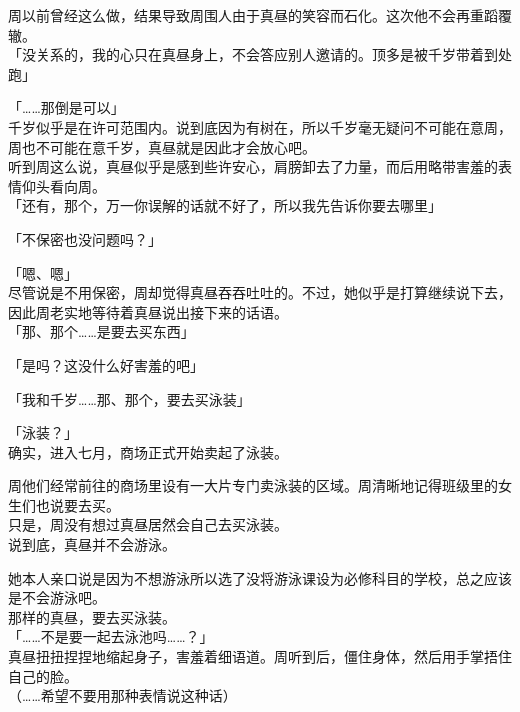 周以前曾经这么做，结果导致周围人由于真昼的笑容而石化。这次他不会再重蹈覆辙。\\

「没关系的，我的心只在真昼身上，不会答应别人邀请的。顶多是被千岁带着到处跑」

「……那倒是可以」\\

千岁似乎是在许可范围内。说到底因为有树在，所以千岁毫无疑问不可能在意周，周也不可能在意千岁，真昼就是因此才会放心吧。\\

听到周这么说，真昼似乎是感到些许安心，肩膀卸去了力量，而后用略带害羞的表情仰头看向周。\\

「还有，那个，万一你误解的话就不好了，所以我先告诉你要去哪里」

「不保密也没问题吗？」

「嗯、嗯」\\

尽管说是不用保密，周却觉得真昼吞吞吐吐的。不过，她似乎是打算继续说下去，因此周老实地等待着真昼说出接下来的话语。\\

「那、那个……是要去买东西」

「是吗？这没什么好害羞的吧」

「我和千岁……那、那个，要去买泳装」

「泳装？」\\

确实，进入七月，商场正式开始卖起了泳装。

周他们经常前往的商场里设有一大片专门卖泳装的区域。周清晰地记得班级里的女生们也说要去买。\\

只是，周没有想过真昼居然会自己去买泳装。\\

说到底，真昼并不会游泳。

她本人亲口说是因为不想游泳所以选了没将游泳课设为必修科目的学校，总之应该是不会游泳吧。\\

那样的真昼，要去买泳装。\\

「……不是要一起去泳池吗……？」\\

真昼扭扭捏捏地缩起身子，害羞着细语道。周听到后，僵住身体，然后用手掌捂住自己的脸。\\

（……希望不要用那种表情说这种话）\\

